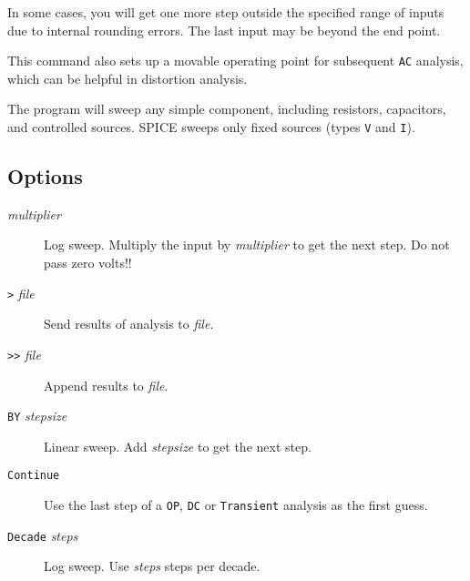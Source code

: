 In some cases, you will get one more step outside the specified range of
inputs due to internal rounding errors.  The last input may be beyond the end
point.

This command also sets up a movable operating point for subsequent {\tt AC}
analysis, which can be helpful in distortion analysis.

The program will sweep any simple component, including resistors,
capacitors, and controlled sources.  SPICE sweeps only fixed sources (types
{\tt V} and {\tt I}).
\subsection{Options}

\begin{description}

\item[{\tt *} {\it multiplier}] Log sweep.  Multiply the
input by {\it multiplier} to get the next step.  Do not
pass zero volts!!

\item[{\tt >} {\it file}] Send results of analysis to {\it file}.

\item[{\tt >>} {\it file}] Append results to {\it file}.



\item[{\tt BY} {\it stepsize}] Linear sweep.  Add {\it
stepsize} to get the next step.

\item[{\tt Continue}] Use the last step of a {\tt OP},
{\tt DC} or {\tt Transient} analysis as the first guess.



\item[{\tt Decade} {\it steps}] Log sweep.  Use {\it
steps} steps per decade.


\end{description}
